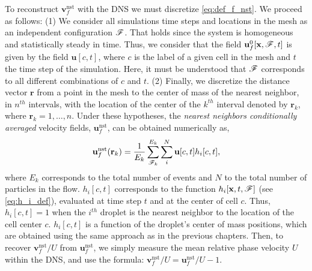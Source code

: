 To reconstruct $\textbf{v}_f^\text{nst}$ with the DNS we must discretize \ref{eq:def_f_nst}. 
We proceed as follows: 
(1) We consider all simulations time steps and locations in the mesh as an independent configuration $\mathscr{F}$.
That holds since the system is homogeneous and statistically steady in time.  
Thus, we consider that the field $\textbf{u}_f^0[\textbf{x},\mathscr{F},t]$ is given by the field $\textbf{u}[c,t]$, where $c$ is the label of a given cell in the mesh and $t$ the time step of the simulation. 
Here, it must be understood that $\mathscr{F}$ corresponds to all different combinations of $c$ and $t$. 
(2) Finally, we discretize the distance vector $\textbf{r}$ from a point in the mesh to the center of mass of the nearest neighbor, in $n^{th}$ intervals, with the location of the center of the $k^{th}$ interval denoted by $\textbf{r}_k$, where $\textbf{r}_k = 1,\ldots,n$. 
Under these hypotheses, the \textit{nearest neighbors conditionally averaged} velocity fields, $\textbf{u}_f^\text{nst}$, can be obtained numerically as, 
\begin{equation}
    \textbf{u}_f^\text{nst}(\textbf{r}_k)
    = 
    \frac{1}{E_k}
    \sum_{\FF_k}^{E_k}
    \sum_i^N
    \textbf{u}[c,t] h_i[c,t],
    \label{eq:vnst_DNS}
\end{equation}
where $E_k$ corresponds to the total number of events and $N$ to the total number of particles in the flow.
$h_i[c,t]$ corresponds to the function $h_i[\textbf{x},t,\mathscr{F}]$  (see \ref{eq:h_i_def}), evaluated at time step $t$ and at the center of cell $c$. 
Thus, $h_i[c,t] = 1$ when the $i^{th}$ droplet is the nearest neighbor to the location of the cell center $c$. 
$h_i[c,t]$ is a function of the droplet's center of mass positions, which are obtained using the same approach as in the previous chapters.
Then, to recover $\textbf{v}_f^\text{nst}/U$ from $\textbf{u}_f^\text{nst}$, we simply measure the mean relative phase velocity $U$ within the DNS, and use the formula: $\textbf{v}_f^\text{nst} /  U = \textbf{u}_f^\text{nst} / U -1 $. 



